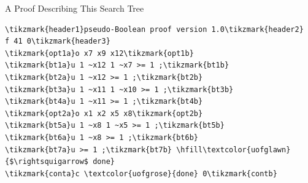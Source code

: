 \documentclass{beamer}
\begin{document}
\begin{frame}[fragile,t]{A Proof Describing This Search Tree}
%
%
\vspace*{-0.5cm}\begin{Verbatim}[commandchars=\\\{\},codes={\catcode`$=3\catcode`^=7}]
\tikzmark{header1}pseudo-Boolean proof version 1.0\tikzmark{header2}
f 41 0\tikzmark{header3}
\tikzmark{opt1a}o x7 x9 x12\tikzmark{opt1b}
\tikzmark{bt1a}u 1 ~x12 1 ~x7 >= 1 ;\tikzmark{bt1b}
\tikzmark{bt2a}u 1 ~x12 >= 1 ;\tikzmark{bt2b}
\tikzmark{bt3a}u 1 ~x11 1 ~x10 >= 1 ;\tikzmark{bt3b}
\tikzmark{bt4a}u 1 ~x11 >= 1 ;\tikzmark{bt4b}
\tikzmark{opt2a}o x1 x2 x5 x8\tikzmark{opt2b}
\tikzmark{bt5a}u 1 ~x8 1 ~x5 >= 1 ;\tikzmark{bt5b}
\tikzmark{bt6a}u 1 ~x8 >= 1 ;\tikzmark{bt6b}
\tikzmark{bt7a}u >= 1 ;\tikzmark{bt7b} \hfill\textcolor{uofglawn}{$\rightsquigarrow$ done}
\tikzmark{conta}c \textcolor{uofgrose}{done} 0\tikzmark{contb}
\end{Verbatim}
\end{frame}
\end{document}
